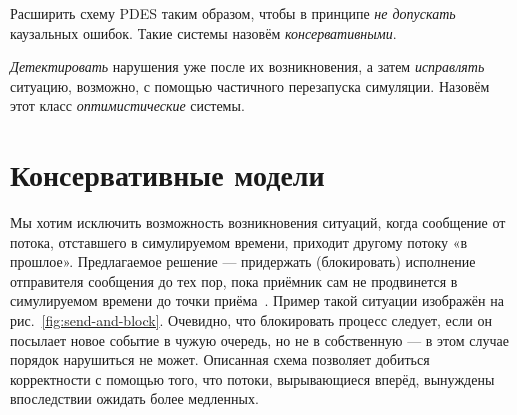 \begin{enumerate*}
    \item Расширить схему PDES таким образом, чтобы в принципе \emph{не допускать} каузальных ошибок. Такие системы назовём \emph{консервативными}. 
    \item \emph{Детектировать} нарушения уже после их возникновения, а затем \emph{исправлять} ситуацию, возможно, с помощью частичного перезапуска симуляции. Назовём этот класс \emph{оптимистические} системы.
\end{enumerate*}

\section[Консервативные модели]{Консервативные модели}

Мы хотим исключить возможность возникновения ситуаций, когда сообщение от потока, отставшего в симулируемом времени, приходит другому потоку «в прошлое». Предлагаемое решение --- придержать (блокировать) исполнение отправителя сообщения до тех пор, пока приёмник сам не продвинется в симулируемом времени до точки приёма~\cite{Misra86distributeddiscrete-event}. Пример такой ситуации изображён на рис.~\ref{fig:send-and-block}. Очевидно, что блокировать процесс следует, если он посылает новое событие в чужую очередь, но не в собственную --- в этом случае порядок нарушиться не может. Описанная схема позволяет добиться корректности с помощью того, что потоки, вырывающиеся вперёд, вынуждены впоследствии ожидать более медленных.

